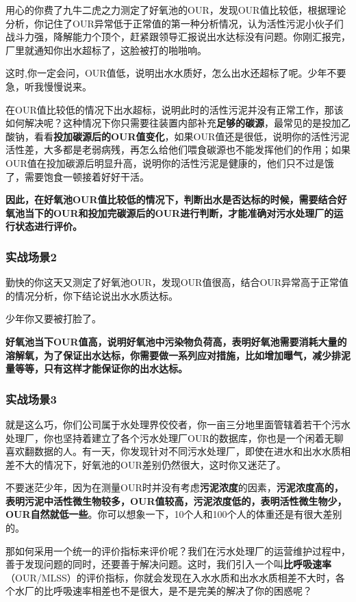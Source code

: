 \documentclass[]{book}
\begin{document}
用心的你费了九牛二虎之力测定了好氧池的OUR，发现OUR值比较低，根据理论分析，你记住了OUR异常低于正常值的第一种分析情况，认为活性污泥小伙子们战斗力强，降解能力个顶个，赶紧跟领导汇报说出水达标没有问题。你刚汇报完，厂里就通知你出水超标了，这脸被打的啪啪响。

这时,你一定会问，OUR值低，说明出水水质好，怎么出水还超标了呢。少年不要急，听我慢慢说来。

在OUR值比较低的情况下出水超标，说明此时的活性污泥并没有正常工作，那该如何解决呢？这种情况下你只需要往装置内部补充\textbf{足够的碳源}，最常见的是投加乙酸钠，看看\textbf{投加碳源后的OUR值变化}，如果OUR值还是很低，说明你的活性污泥活性差，大多都是老弱病残，再怎么给他们喂食碳源也不能发挥他们的作用；如果OUR值在投加碳源后明显升高，说明你的活性污泥是健康的，他们只不过是饿了，需要饱食一顿接着好好干活。

\textbf{因此，在好氧池OUR值比较低的情况下，判断出水是否达标的时候，需要结合好氧池当下的OUR和投加完碳源后的OUR进行判断，才能准确对污水处理厂的运行状态进行评价。}

\subsubsection{实战场景2}\label{2}

勤快的你这天又测定了好氧池OUR，发现OUR值很高，结合OUR异常高于正常值的情况分析，你下结论说出水水质达标。

少年你又要被打脸了。

\textbf{好氧池当下OUR值高，说明好氧池中污染物负荷高，表明好氧池需要消耗大量的溶解氧，为了保证出水达标，你需要做一系列应对措施，比如增加曝气，减少排泥量等等，只有这样才能保证你的出水达标。}

\subsubsection{实战场景3}\label{3}

就是这么巧，你们公司属于水处理界佼佼者，你一亩三分地里面管辖着若干个污水处理厂，你也坚持着建立了各个污水处理厂OUR的数据库，你也是一个闲着无聊喜欢翻数据的人。有一天，你发现针对不同污水处理厂，即使在进水和出水水质相差不大的情况下，好氧池的OUR差别仍然很大，这时你又迷茫了。

不要迷茫少年，因为在测量OUR时并没有考虑\textbf{污泥浓度}的因素，\textbf{污泥浓度高的，表明污泥中活性微生物较多，OUR值较高，污泥浓度低的，表明活性微生物少，OUR自然就低一些}。你可以想象一下，10个人和100个人的体重还是有很大差别的。

那如何采用一个统一的评价指标来评价呢？我们在污水处理厂的运营维护过程中，善于发现问题的同时，还要善于解决问题。这时，我们引入一个叫\textbf{比呼吸速率}（OUR/MLSS）的评价指标，你就会发现在入水水质和出水水质相差不大时，各个水厂的比呼吸速率相差也不是很大，是不是完美的解决了你的困惑呢？
\end{document}
